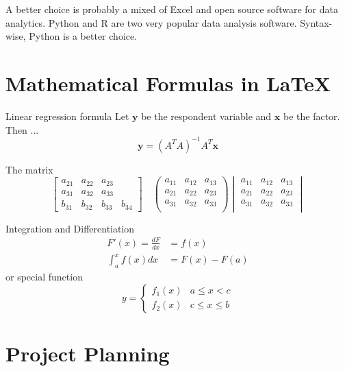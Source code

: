 \documentclass[a4paper,12pt]{article}
\begin{document}
A better choice is probably a mixed of Excel and open source software
for data analytics.  Python and R are two very popular data analysis
software.  Syntax-wise, Python is a better choice.



\section{Mathematical Formulas in \LaTeX{}}

Linear regression formula
Let $\mathbf{y}$ be the respondent variable and $\mathbf{x}$ be the
factor.  Then ...
$$
\mathbf{y} = (A^TA)^{-1} A^T\mathbf{x}
$$

The matrix
$$
\begin{bmatrix}
  a_{21} & a_{22} & a_{23} \\
  a_{31} & a_{32} & a_{33} \\
  b_{31} & b_{32} & b_{33} & b_{34}
\end{bmatrix} \quad
\begin{pmatrix}
  a_{11} & a_{12} & a_{13} \\
  a_{21} & a_{22} & a_{23} \\
  a_{31} & a_{32} & a_{33} \\
\end{pmatrix}
\begin{vmatrix}
  a_{11} & a_{12} & a_{13} \\
  a_{21} & a_{22} & a_{23} \\
  a_{31} & a_{32} & a_{33} \\
\end{vmatrix}
$$

Integration and Differentiation
$$
\begin{aligned}
  F'(x) = \frac{dF}{dx} &= f(x)\\
  \int_a^x f(x) dx  &= F(x) - F(a)
\end{aligned}
$$
or special function
$$
y =
\begin{cases}
  f_1(x) & a\le x < c\\
  f_2(x) & c\le x \le b
\end{cases}
$$


%


\section{Project Planning}
\end{document}

